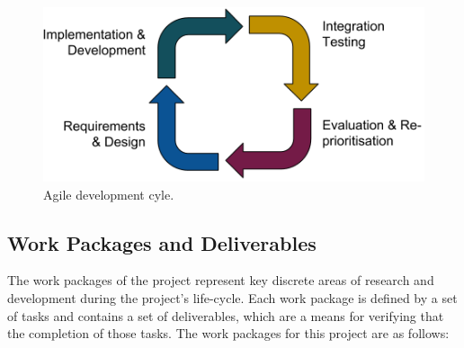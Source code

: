 \documentclass[a4paper]{article}
\begin{document}
\begin{figure}[h!]
  
  \centering
    \includegraphics[scale=0.25]{scrum}
  \caption{Agile development cyle.}
  \label{scrum}
\end{figure}

\subsection{Work Packages and Deliverables}

The work packages of the project represent key discrete areas of research and development during the
project's life-cycle. Each work package is defined by a set of tasks and contains a set of
deliverables, which are a means for verifying that the completion of those tasks. The work packages
for this project are as follows: 
\end{document}
